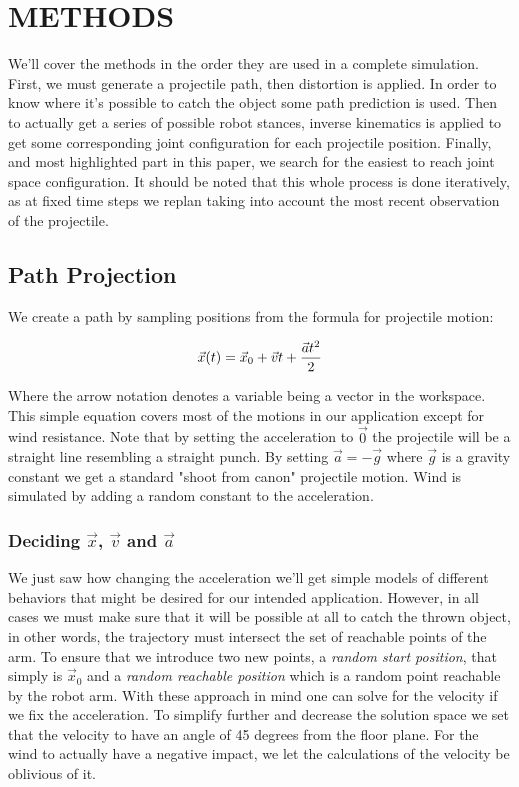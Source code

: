 \documentclass[letterpaper, 10 pt, conference]{ieeeconf}  %
\begin{document}
\section{METHODS}

We'll cover the methods in the order they are used in a complete simulation.
First, we must generate a projectile path, then distortion is applied. In order
to know where it's possible to catch the object some path prediction is used.
Then to actually get a series of possible robot stances, inverse kinematics is
applied to get some corresponding joint configuration for each projectile
position. Finally, and most highlighted part in this paper, we search for the
easiest to reach joint space configuration. It should be noted that this whole
process is done iteratively, as at fixed time steps we replan taking into account
the most recent observation of the projectile.

\subsection{Path Projection}

We create a path by sampling positions from the formula for projectile motion:

\[
  \vec{x}(t) = \vec{x}_0 + \vec{v}t + {\vec{a}t^2 \over 2}
\]

Where the arrow notation denotes a variable being a vector in the
workspace.  This simple equation covers most of the motions in our
application except for wind resistance. Note that by setting the
acceleration to $\vec{0}$ the projectile will be a straight line
resembling a straight punch. By setting $\vec{a} = -\vec{g}$ where
$\vec{g}$ is a gravity constant we get a standard "shoot from canon"
projectile motion. Wind is simulated by adding a random constant to
the acceleration.

\subsubsection{Deciding $\vec{x}$, $\vec{v}$ and $\vec{a}$}

We just saw how changing the acceleration we'll get simple models of
different behaviors that might be desired for our intended application.
However, in all cases we must make sure that it will be possible at all
to catch the thrown object, in other words, the trajectory must
intersect the set of reachable points of the arm. To ensure that we
introduce two new points, a \emph{random start position}, that simply is
$\vec{x}_0$ and a \emph{random reachable position} which is a random
point reachable by the robot arm. With these approach in mind one can
solve for the velocity if we fix the acceleration. To simplify further
and decrease the solution space we set that the velocity to have an
angle of 45 degrees from the floor plane. For the wind to actually have
a negative impact, we let the calculations of the velocity be oblivious
of it.
\end{document}

